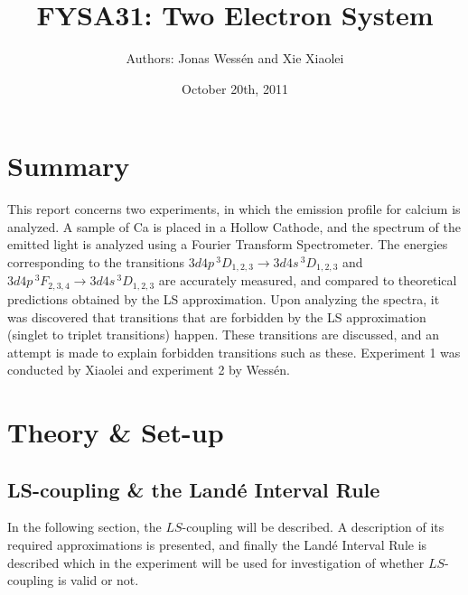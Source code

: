 \documentclass[a4paper]{article}
\title{\textbf{FYSA31:} Two Electron System}
\author{Authors: Jonas Wess\'en and Xie Xiaolei}
\date{October 20th, 2011}
\begin{document}
 
  
\maketitle    
\thispagestyle{empty} 
 
\newpage

\section{Summary}
 
This report concerns two experiments, in which the emission profile for calcium is analyzed. A sample of Ca is placed in a Hollow Cathode, and the spectrum of the emitted light is analyzed using a Fourier Transform Spectrometer. The energies corresponding to the transitions $3d4p\,^3D_{1,2,3} \to 3d4s\,^3D_{1,2,3}$ and $3d4p\,^3F_{2,3,4} \to 3d4s\,^3D_{1,2,3}$ are accurately measured, and compared to theoretical predictions obtained by the LS approximation. Upon analyzing the spectra, it was discovered that transitions that are forbidden by the LS approximation (singlet to triplet transitions) happen. These transitions are discussed, and an attempt is made to explain forbidden transitions such as these. Experiment 1 was conducted by Xiaolei and experiment 2 by Wess\'en.  
 
\section{Theory \& Set-up}
 
\subsection{LS-coupling \& the Land\'e Interval Rule}

In the following section, the $LS$-coupling will be described. A description of its required approximations is presented, and finally the Land\'e Interval Rule is described which in the experiment will be used for investigation of whether $LS$-coupling is valid or not. 
\end{document}
